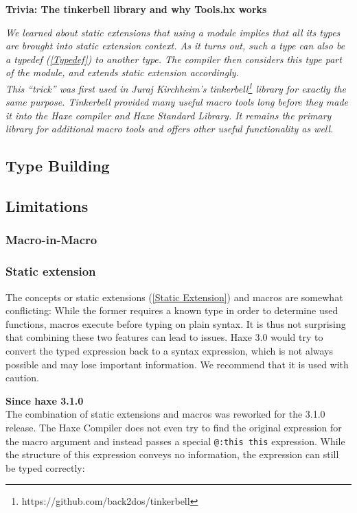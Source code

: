 \documentclass{article}
\newcommand{\expr}[1]{\texttt{#1}}
\newenvironment{myshaded}
  {\def\FrameCommand{\fboxsep=\topsep\colorbox{bgcolor}}%
  \MakeFramed {\advance\hsize-\width \FrameRestore}}%
 {\endMakeFramed}
\newcommand{\trivia}[2]
	{\begin{myshaded}\noindent\textbf{Trivia: #1}\par\nobreak\noindent\ignorespaces\textit{#2}\end{myshaded}}
\newcommand{\tref}[2]{#1 (\ref{#2})}
\newcommand{\since}[1]{\noindent\textbf{Since haxe #1}\\}
\begin{document}
\trivia{The tinkerbell library and why Tools.hx works}{We learned about static extensions that using a \emph{module} implies that all its types are brought into static extension context. As it turns out, such a type can also be a \tref{typedef}{Typedef} to another type. The compiler then considers this type part of the module, and extends static extension accordingly.\\
This ``trick'' was first used in Juraj Kirchheim's \emph{tinkerbell}\footnote{https://github.com/back2dos/tinkerbell} library for exactly the same purpose. Tinkerbell provided many useful macro tools long before they made it into the Haxe compiler and Haxe Standard Library. It remains the primary library for additional macro tools and offers other useful functionality as well.} 



\subsection{Type Building}
\label{Type Building}

\subsection{Limitations}

\subsubsection{Macro-in-Macro}

\subsubsection{Static extension}

The concepts or \tref{static extensions}{Static Extension} and macros are somewhat conflicting: While the former requires a known type in order to determine used functions, macros execute before typing on plain syntax. It is thus not surprising that combining these two features can lead to issues. Haxe 3.0 would try to convert the typed expression back to a syntax expression, which is not always possible and may lose important information. We recommend that it is used with caution.

\since{3.1.0}

The combination of static extensions and macros was reworked for the 3.1.0 release. The Haxe Compiler does not even try to find the original expression for the macro argument and instead passes a special \expr{@:this this} expression. While the structure of this expression conveys no information, the expression can still be typed correctly:
\end{document}
